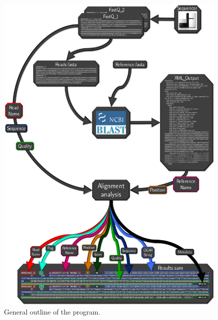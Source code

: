 \begin{figure}
\includegraphics[scale=0.75]{img/generalOutline}
\caption{General outline of the program.}
\label{fig:generalOutline}
\end{figure}
